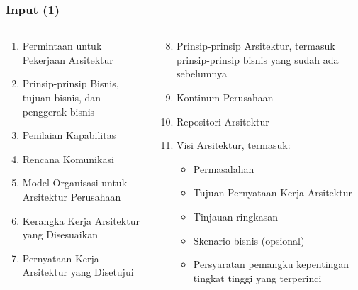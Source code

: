 \documentclass[aspectratio=169]{beamer}
\begin{document}
	\begin{frame}
		\frametitle{Input (1)}
		\begin{columns}
			\begin{column}{0.5\textwidth}
				\begin{center}
					\begin{enumerate}
						\item Permintaan untuk Pekerjaan Arsitektur
						\item Prinsip-prinsip Bisnis, tujuan bisnis, dan penggerak bisnis
						\item Penilaian Kapabilitas
						\item Rencana Komunikasi
						\item Model Organisasi untuk Arsitektur Perusahaan
						\item Kerangka Kerja Arsitektur yang Disesuaikan
						\item Pernyataan Kerja Arsitektur yang Disetujui
						
					\end{enumerate}
				\end{center}
			\end{column}
			\begin{column}{0.5\textwidth}
				\begin{center}
					\begin{enumerate}
						\setcounter{enumi}{7}
						\item Prinsip-prinsip Arsitektur, termasuk prinsip-prinsip bisnis yang sudah ada sebelumnya
						\item Kontinum Perusahaan
						\item Repositori Arsitektur
						\item Visi Arsitektur, termasuk:
						\begin{itemize}
							\item Permasalahan
							\item Tujuan Pernyataan Kerja Arsitektur
							\item Tinjauan ringkasan
							\item Skenario bisnis (opsional)
							\item Persyaratan pemangku kepentingan tingkat tinggi yang terperinci
						\end{itemize}
						
					\end{enumerate}
				\end{center}
			\end{column}
		\end{columns}
	\end{frame}
	
\end{document}
